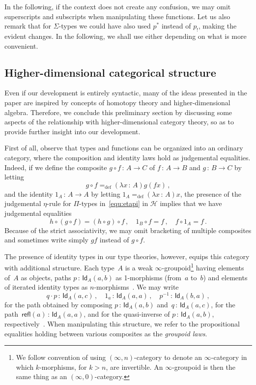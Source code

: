 \documentclass[10pt,a4paper,oneside,reqno]{amsart}
\numberwithin{equation}{section}
\theoremstyle{mythm}
\theoremstyle{mydef}
\theoremstyle{myrmk}
\newcommand{\defeq}{=_{\mathrm{def}}}
\newcommand{\co}{\,{:}\,}
\newcommand{\ct}{\cdot}
\newcommand{\Hint}{\mathcal{H}}
\newcommand{\Id}{\mathsf{Id}}
\newcommand{\refl}{\mathsf{refl}}
\begin{document}
In the following, if the context does not create any confusion, we may omit  superscripts and subscripts when manipulating these functions. Let us also remark that for $\Sigma$-types we could have also used $p^*$ instead
of $p_{!}$, making the evident changes. In the following, we shall use either depending on what is more convenient.

\subsection*{Higher-dimensional categorical structure} Even if our development is entirely syntactic,
many of the ideas presented in the paper are inspired by concepts of homotopy theory and higher-dimensional
algebra. Therefore, we conclude this preliminary section by  discussing some aspects of the relationship with higher-dimensional category theory, so as to provide further insight into our development.

 First of all, observe that types and functions can be organized into an ordinary 
 category, where the composition and identity laws hold as judgemental equalities. Indeed, if we define the composite $g \circ f \co A 
\to C$ of $f \co A \to B$ and $g \co B \to C$ by letting
\[
 g \circ f \defeq (\lambda x \co A) g ( f  x) \, ,
 \]
 and the identity $1_A \co A \to A$ by letting $1_A \defeq (\lambda x \co A) x$, 
 the presence of the judgemental $\eta$-rule for $\Pi$-types in~\eqref{equ:etapi} in $\Hint$ implies that
 we have judgemental equalities
 \begin{equation}
 \label{equ:assoc}
  h \circ (g \circ f) = (h \circ g) \circ f \, , \quad 1_B \circ f =  f \, , \quad  f \circ 1_A = f \, .
  \end{equation}
  Because of the strict associativity, we may omit bracketing of multiple composites and sometimes write simply $gf$ instead of $g \circ f$. 

The presence of identity types in our type theories, however, equips this category with additional structure. Each  
type~$A$ is a weak $\infty$-groupoid\footnote{We follow convention of using $(\infty, n)$-category to denote an $\infty$-category in which $k$-morphisms, for $k > n$, are invertible. An $\infty$-groupoid is then the same thing as an $(\infty,0)$-category.}  having  elements of~$A$ as objects, paths
$p \co \Id_A(a,b)$ as 1-morphisms (from~$a$ to~$b$) and elements of iterated identity types as 
$n$-morphisms~\cite{LumsdaineP:weaci,vandenBergB:typwg}. 
We may write 
\[
q \ct p \co \Id_A(a,c) \, , \quad
1_a \co \Id_A(a,a) \, , \quad 
p^{-1} \co \Id_A(b,a) \, ,
\]
for the path obtained by composing $p \co \Id_A(a,b)$ and~$q \co \Id_A(a,c)$,  for the path~$\refl(a) \co \Id_A(a,a)$, and for the quasi-inverse of $p \co \Id_A(a,b)$, respectively~\cite{HofmannM:gromtt}. 
When manipulating this structure, we  refer to the  propositional equalities holding between 
various composites as the \emph{groupoid laws}.
\end{document}
